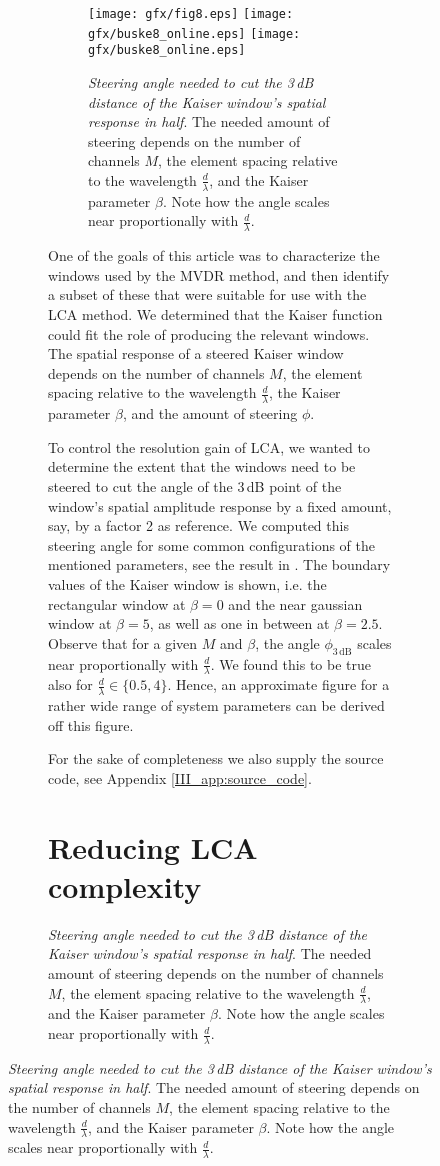 \begin{figure}[tbp]
\begin{figure}[tbp]
\begin{figure*}[t]
\begin{figure*}[tbp]
\begin{figure*}[tb]
\begin{figure}[t]
\ifPhdDoc\centering
   \texttt{[image: gfx/fig8.eps]}%
\else
   \ifPeerReview\centering%
      \texttt{[image: gfx/buske8\_online.eps]}%
   \else%
      \texttt{[image: gfx/buske8\_online.eps]}%
   \fi
\fi%
\caption{\emph{Steering angle needed to cut the \protect\minus{}3\,dB distance of the Kaiser window's spatial response in half}. The needed amount of steering depends on the number of channels $M$, the element spacing relative to the wavelength $\frac{d}{\lambda}$, and the Kaiser parameter $\beta$. Note how the angle scales near proportionally with $\frac{d}{\lambda}$. }\label{III_steering_angle_3dB}
\end{figure}
%
One of the goals of this article was to characterize the windows used by the MVDR method, and then identify a subset of these that were suitable for use with the LCA method. We determined that the Kaiser function could fit the role of producing the relevant windows. The spatial response of a steered Kaiser window depends on the number of channels $M$, the element spacing relative to the wavelength $\frac{d}{\lambda}$, the Kaiser parameter $\beta$, and the amount of steering $\phi$.

To control the resolution gain of LCA, we wanted to determine the extent that the windows need to be steered to cut the angle of the \minus{}3\,dB point of the window's spatial amplitude response by a fixed amount, say, by a factor 2 as reference. We computed this steering angle for some common configurations of the mentioned parameters, see the result in . The boundary values of the Kaiser window is shown, i.e. the rectangular window at $\beta=0$ and the near gaussian window at $\beta=5$, as well as one in between at $\beta=2.5$. Observe that for a given $M$ and $\beta$, the angle $\phi_\mathrm{3\,dB}$ scales near proportionally with $\frac{d}{\lambda}$. We found this to be true also for $\frac{d}{\lambda}\in\{0.5,4\}$. Hence, an approximate figure for a rather wide range of system parameters can be derived off this figure.

For the sake of completeness we also supply the source code, see Appendix \ref{III_app:source_code}.


\section{Reducing LCA complexity}\label{III_sec:reducing_lca_complexity}


\end{figure*}
\end{figure*}
\end{figure*}
\end{figure}
\end{figure}
